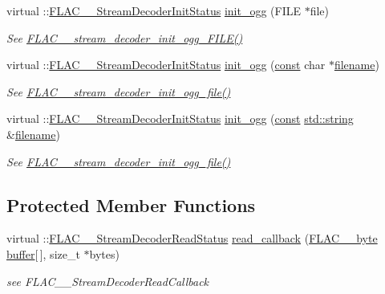 \begin{DoxyCompactItemize}
virtual \+::\hyperlink{group__flac__stream__decoder_gaaed54a24ac6310d29c5cafba79759c44}{F\+L\+A\+C\+\_\+\+\_\+\+Stream\+Decoder\+Init\+Status} \hyperlink{class_f_l_a_c_1_1_decoder_1_1_file_a701d7418ce3e21c71752b34016980185}{init\+\_\+ogg} (F\+I\+LE $\ast$file)
\begin{DoxyCompactList}\small\item\em See \hyperlink{group__flac__stream__decoder_gac6a35b1db07e057ec9912f637b37dd74}{F\+L\+A\+C\+\_\+\+\_\+stream\+\_\+decoder\+\_\+init\+\_\+ogg\+\_\+\+F\+I\+L\+E()} \end{DoxyCompactList}\item 
virtual \+::\hyperlink{group__flac__stream__decoder_gaaed54a24ac6310d29c5cafba79759c44}{F\+L\+A\+C\+\_\+\+\_\+\+Stream\+Decoder\+Init\+Status} \hyperlink{class_f_l_a_c_1_1_decoder_1_1_file_a7f8d6da366d57bb7361119f5cc831ce0}{init\+\_\+ogg} (\hyperlink{getopt1_8c_a2c212835823e3c54a8ab6d95c652660e}{const} char $\ast$\hyperlink{test__portburn_8cpp_a7efa5e9c7494c7d4586359300221aa5d}{filename})
\begin{DoxyCompactList}\small\item\em See \hyperlink{group__flac__stream__decoder_ga609f2a43987d6abeaef654575462030c}{F\+L\+A\+C\+\_\+\+\_\+stream\+\_\+decoder\+\_\+init\+\_\+ogg\+\_\+file()} \end{DoxyCompactList}\item 
virtual \+::\hyperlink{group__flac__stream__decoder_gaaed54a24ac6310d29c5cafba79759c44}{F\+L\+A\+C\+\_\+\+\_\+\+Stream\+Decoder\+Init\+Status} \hyperlink{class_f_l_a_c_1_1_decoder_1_1_file_a96c5bd4520e4081873120f1dbcdbf671}{init\+\_\+ogg} (\hyperlink{getopt1_8c_a2c212835823e3c54a8ab6d95c652660e}{const} \hyperlink{test__lib_f_l_a_c_2format_8c_ab02026ad0de9fb6c1b4233deb0a00c75}{std\+::string} \&\hyperlink{test__portburn_8cpp_a7efa5e9c7494c7d4586359300221aa5d}{filename})
\begin{DoxyCompactList}\small\item\em See \hyperlink{group__flac__stream__decoder_ga609f2a43987d6abeaef654575462030c}{F\+L\+A\+C\+\_\+\+\_\+stream\+\_\+decoder\+\_\+init\+\_\+ogg\+\_\+file()} \end{DoxyCompactList}\end{DoxyCompactItemize}
\subsection*{Protected Member Functions}
\begin{DoxyCompactItemize}
\item 
virtual \+::\hyperlink{group__flac__stream__decoder_gad793ead451206c64a91dc0b851027b93}{F\+L\+A\+C\+\_\+\+\_\+\+Stream\+Decoder\+Read\+Status} \hyperlink{class_f_l_a_c_1_1_decoder_1_1_file_acf292efaab02383905cdc3ec559ae3ca}{read\+\_\+callback} (\hyperlink{ordinals_8h_a5eb569b12d5b047cdacada4d57924ee3}{F\+L\+A\+C\+\_\+\+\_\+byte} \hyperlink{structbuffer}{buffer}\mbox{[}$\,$\mbox{]}, size\+\_\+t $\ast$bytes)
\begin{DoxyCompactList}\small\item\em see F\+L\+A\+C\+\_\+\+\_\+\+Stream\+Decoder\+Read\+Callback \end{DoxyCompactList}\end{DoxyCompactItemize}
